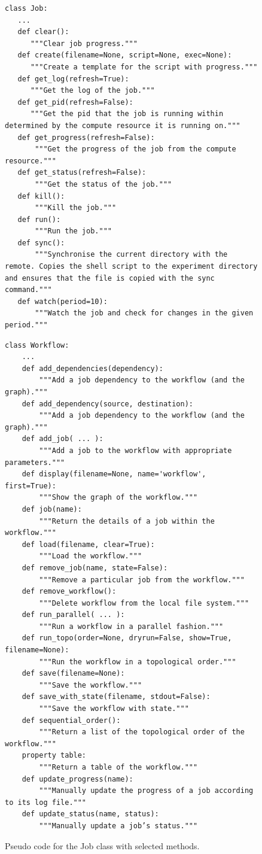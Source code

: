 \begin{figure}[!h]
\begin{verbatim}
class Job:
   ...
   def clear():
      """Clear job progress."""
   def create(filename=None, script=None, exec=None):
      """Create a template for the script with progress."""
   def get_log(refresh=True):
      """Get the log of the job."""
   def get_pid(refresh=False):
      """Get the pid that the job is running within determined by the compute resource it is running on."""
   def get_progress(refresh=False):
       """Get the progress of the job from the compute resource."""
   def get_status(refresh=False):
       """Get the status of the job."""
   def kill():
       """Kill the job."""
   def run():
       """Run the job."""
   def sync():
       """Synchronise the current directory with the remote. Copies the shell script to the experiment directory and ensures that the file is copied with the sync command."""
   def watch(period=10):
       """Watch the job and check for changes in the given period."""
\end{verbatim}
\caption{Pseudo code for the Job class with selected methods.}
\label{fig:code-job}

\bigskip

\begin{verbatim}
class Workflow:
    ...
    def add_dependencies(dependency):
        """Add a job dependency to the workflow (and the graph)."""
    def add_dependency(source, destination):
        """Add a job dependency to the workflow (and the graph)."""
    def add_job( ... ):
        """Add a job to the workflow with appropriate parameters."""
    def display(filename=None, name='workflow', first=True):
        """Show the graph of the workflow."""
    def job(name):
        """Return the details of a job within the workflow."""
    def load(filename, clear=True):
        """Load the workflow."""
    def remove_job(name, state=False):
        """Remove a particular job from the workflow."""
    def remove_workflow():
        """Delete workflow from the local file system."""
    def run_parallel( ... ):
        """Run a workflow in a parallel fashion."""
    def run_topo(order=None, dryrun=False, show=True, filename=None):
        """Run the workflow in a topological order."""
    def save(filename=None):
        """Save the workflow."""
    def save_with_state(filename, stdout=False):
        """Save the workflow with state."""
    def sequential_order():
        """Return a list of the topological order of the workflow."""
    property table:
        """Return a table of the workflow."""
    def update_progress(name):
        """Manually update the progress of a job according to its log file."""
    def update_status(name, status):
        """Manually update a job’s status."""
\end{verbatim}
\caption{Pseudo code for the Job class with selected methods.}
\label{fig:code-workflow}
\end{figure}


